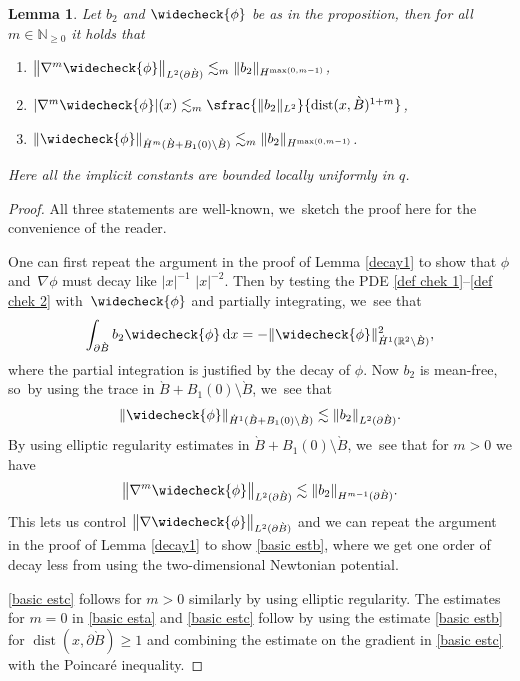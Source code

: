 \documentclass[10pt]{amsart}
\let\backslash\setminus
\newtheorem{lemma}[theorem]{Lemma}
\theoremstyle{definition}
\DeclareMathOperator{\dist}{dist}
\newcommand\R{\mathbb{R}}
\newcommand\N{\mathbb{N}}
\newcommand\anorm[1]{\lVert #1\rVert}
\newcommand\bnorm[1]{\bigl\lVert #1\bigr\rVert}
\newcommand\eq{=}
\newcommand\dd{\,\mathrm{d}}
\newcommand\dx{\dd x}
\let\chek\widecheck
\let\de\partial
\begin{document}
\begin{lemma}\label{basic est}
Let $b_2$ and $\chek{\phi}$ be as in the proposition, then for all $m\in \N_{\geq 0}$ it holds that
\begin{enumerate}
\item\label{basic esta}
$\bnorm{\nabla^m\chek{\phi}}_{L^2(\de \grave{B})}\lesssim_m\anorm{b_2}_{{H}^{\max(0,m-1)}}$,
\item\label{basic estb}
$|\nabla^m\chek{\phi}|(x)\lesssim_m \sfrac{\anorm{b_2}_{L^2}}{\dist(x,\grave{B})^{1+m}}$,
\item\label{basic estc}
$\anorm{\chek{\phi}}_{\dot{H}^m(\grave{B}+B_1(0)\backslash \grave{B})}\lesssim_m  \anorm{b_2}_{H^{\max(0,m-1)}}$.
\end{enumerate}
Here all the implicit constants are bounded locally uniformly in $q$.
\end{lemma}
\begin{proof} All three statements are well-known, we~sketch the proof here for the convenience of the reader.

One can first repeat the argument in the proof of Lemma \ref{decay1} to show that $\phi$ and~$\nabla\phi$ must decay like $|x|^{-1}$ \resp $|x|^{-2}$.
Then by testing the PDE \eqref{def chek 1}--\eqref{def chek 2} with~$\chek{\phi}$ and partially integrating, we~see that
\begin{align*}
\int_{\de \grave{B}}b_2\chek{\phi}\dx\eq -\anorm{\chek{\phi}}_{\dot{H}^1(\R^2\backslash \grave{B})}^2,
\end{align*}
where the partial integration is justified by the decay of $\phi$.
Now $b_2$ is mean-free, so~by using the trace in $\grave{B}+B_1(0)\backslash \grave{B}$, we~see that
\begin{align*}
\anorm{\chek{\phi}}_{\dot{H}^1(\grave{B}+B_1(0)\backslash \grave{B})}\lesssim \anorm{b_2}_{L^2(\de \grave{B})}.
\end{align*}
By using elliptic regularity estimates in $\grave{B}+B_1(0)\backslash \grave{B}$, we~see that for $m>0$ we have
\begin{align*}
\bnorm{\nabla^m\chek{\phi}}_{L^2(\de \grave{B})}\lesssim \anorm{b_2}_{H^{m-1}(\de \grave{B})}.
\end{align*}
This lets us control $\bnorm{\nabla \chek{\phi}}_{L^2(\de\grave{B})}$ and we can repeat the argument in the proof of Lemma \ref{decay1} to show \eqref{basic estb}, where we get one order of decay less from using the two-dimensional Newtonian potential.

\eqref{basic estc} follows for $m>0$ similarly by using elliptic regularity. The estimates for $m=0$ in \eqref{basic esta} and \eqref{basic estc} follow by using the estimate \eqref{basic estb} for $\dist(x,\de\grave{B})\geq 1$ and combining the estimate on the gradient in \eqref{basic estc} with \eg the Poincaré inequality.
\end{proof}
\end{document}
